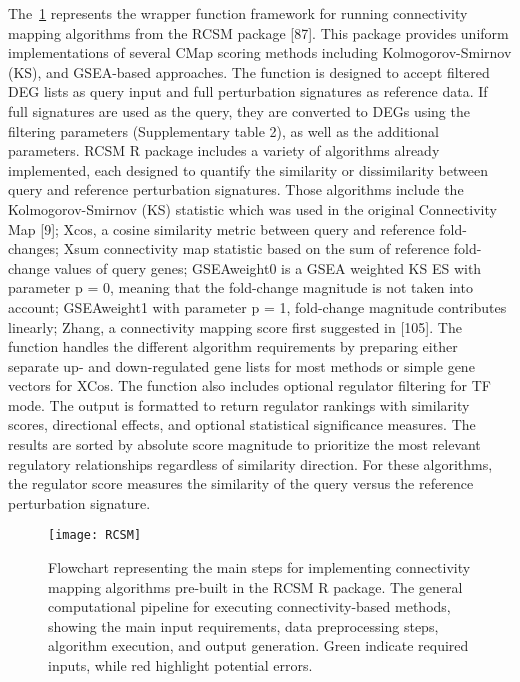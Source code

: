 The~\ref{fig:fig5} represents the wrapper function framework for running connectivity mapping algorithms from the RCSM package [87]. This package provides uniform implementations of several CMap scoring methods including Kolmogorov-Smirnov (KS), and GSEA-based approaches. The function is designed to accept filtered DEG lists as query input and full perturbation signatures as reference data. If full signatures are used as the query, they are converted to DEGs using the filtering parameters (Supplementary table 2), as well as the additional parameters. RCSM R package includes a variety of algorithms already implemented, each designed to quantify the similarity or dissimilarity between query and reference perturbation signatures. Those algorithms include the Kolmogorov-Smirnov (KS) statistic which was used in the original Connectivity Map [9]; Xcos, a cosine similarity metric between query and reference fold-changes; Xsum connectivity map statistic based on the sum of reference fold-change values of query genes; GSEAweight0 is a GSEA weighted KS  ES with parameter p = 0, meaning that the fold-change magnitude is not taken into account; GSEAweight1 with parameter p = 1, fold-change magnitude contributes linearly; Zhang, a connectivity mapping score first suggested in [105].
The function handles the different algorithm requirements by preparing either separate up- and down-regulated gene lists for most methods or simple gene vectors for XCos. The function also includes optional regulator filtering for TF mode. The output is formatted to return regulator rankings with similarity scores, directional effects, and optional statistical significance measures. The results are sorted by absolute score magnitude to prioritize the most relevant regulatory relationships regardless of similarity direction. For these algorithms, the regulator score measures the similarity of the query versus the reference perturbation signature.

\begin{figure}[htbp]
    \centering
    \texttt{[image: RCSM]}
    \caption{Flowchart representing the main steps for implementing connectivity mapping algorithms pre-built in the RCSM R package. The general computational pipeline for executing connectivity-based methods, showing the main input requirements, data preprocessing steps, algorithm execution, and output generation. Green indicate required inputs, while red highlight potential errors.}
    \label{fig:fig5}
\end{figure}



